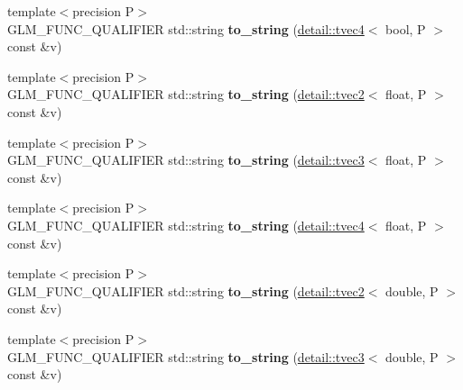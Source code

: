 \begin{DoxyCompactItemize}
\item 
\hypertarget{namespaceglm_a52849ff41e38c4cfcf17d832b3114450}{{\footnotesize template$<$precision P$>$ }\\G\-L\-M\-\_\-\-F\-U\-N\-C\-\_\-\-Q\-U\-A\-L\-I\-F\-I\-E\-R std\-::string {\bfseries to\-\_\-string} (\hyperlink{structglm_1_1detail_1_1tvec4}{detail\-::tvec4}$<$ bool, P $>$ const \&v)}\label{namespaceglm_a52849ff41e38c4cfcf17d832b3114450}

\item 
\hypertarget{namespaceglm_a6698c0d7c025b7261f4eb51b1baf7290}{{\footnotesize template$<$precision P$>$ }\\G\-L\-M\-\_\-\-F\-U\-N\-C\-\_\-\-Q\-U\-A\-L\-I\-F\-I\-E\-R std\-::string {\bfseries to\-\_\-string} (\hyperlink{structglm_1_1detail_1_1tvec2}{detail\-::tvec2}$<$ float, P $>$ const \&v)}\label{namespaceglm_a6698c0d7c025b7261f4eb51b1baf7290}

\item 
\hypertarget{namespaceglm_ada8090162e09080749f93e52ca6e1722}{{\footnotesize template$<$precision P$>$ }\\G\-L\-M\-\_\-\-F\-U\-N\-C\-\_\-\-Q\-U\-A\-L\-I\-F\-I\-E\-R std\-::string {\bfseries to\-\_\-string} (\hyperlink{structglm_1_1detail_1_1tvec3}{detail\-::tvec3}$<$ float, P $>$ const \&v)}\label{namespaceglm_ada8090162e09080749f93e52ca6e1722}

\item 
\hypertarget{namespaceglm_a0b90d4ba2c4c0d16a6bc71a80084a6d6}{{\footnotesize template$<$precision P$>$ }\\G\-L\-M\-\_\-\-F\-U\-N\-C\-\_\-\-Q\-U\-A\-L\-I\-F\-I\-E\-R std\-::string {\bfseries to\-\_\-string} (\hyperlink{structglm_1_1detail_1_1tvec4}{detail\-::tvec4}$<$ float, P $>$ const \&v)}\label{namespaceglm_a0b90d4ba2c4c0d16a6bc71a80084a6d6}

\item 
\hypertarget{namespaceglm_aacac89a227ca1a0dac8a43298ddccee5}{{\footnotesize template$<$precision P$>$ }\\G\-L\-M\-\_\-\-F\-U\-N\-C\-\_\-\-Q\-U\-A\-L\-I\-F\-I\-E\-R std\-::string {\bfseries to\-\_\-string} (\hyperlink{structglm_1_1detail_1_1tvec2}{detail\-::tvec2}$<$ double, P $>$ const \&v)}\label{namespaceglm_aacac89a227ca1a0dac8a43298ddccee5}

\item 
\hypertarget{namespaceglm_a2192a3fcadf236a82f9cafe2291e5343}{{\footnotesize template$<$precision P$>$ }\\G\-L\-M\-\_\-\-F\-U\-N\-C\-\_\-\-Q\-U\-A\-L\-I\-F\-I\-E\-R std\-::string {\bfseries to\-\_\-string} (\hyperlink{structglm_1_1detail_1_1tvec3}{detail\-::tvec3}$<$ double, P $>$ const \&v)}\label{namespaceglm_a2192a3fcadf236a82f9cafe2291e5343}


\end{DoxyCompactItemize}
